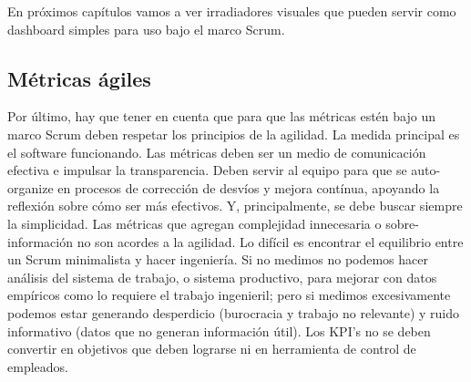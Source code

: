 En próximos capítulos vamos a ver irradiadores visuales que pueden servir como dashboard simples para uso bajo el marco Scrum.

\subsection{Métricas ágiles}

Por último, hay que tener en cuenta que para que las métricas estén bajo un marco Scrum deben respetar los principios de la agilidad. La medida principal es el software funcionando. Las métricas deben ser un medio de comunicación efectiva e impulsar la transparencia. Deben servir al equipo para que se auto-organize en procesos de corrección de desvíos y mejora contínua, apoyando la reflexión sobre cómo ser más efectivos. Y, principalmente, se debe buscar siempre la simplicidad. Las métricas que agregan complejidad innecesaria o sobre-información no son acordes a la agilidad. Lo difícil es encontrar el equilibrio entre un Scrum minimalista y hacer ingeniería. Si no medimos no podemos hacer análisis del sistema de trabajo, o sistema productivo, para mejorar con datos empíricos como lo requiere el trabajo ingenieril; pero si medimos excesivamente podemos estar generando desperdicio (burocracia y trabajo no relevante) y ruido informativo (datos que no generan información útil). Los KPI's no se deben convertir en objetivos que deben lograrse ni en herramienta de control de empleados.

